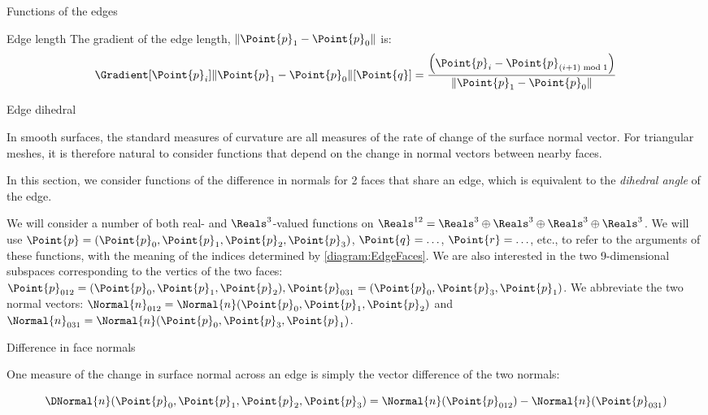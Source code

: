 \begin{plSection}{Functions of the edges}
\begin{plSection}{Edge length}
The gradient of the edge length, $\|\Point{p}_1 - \Point{p}_0\|$ is:
\begin{equation}
\Gradient[\Point{p}_i]{\| \Point{p}_1 - \Point{p}_0 \|}[\Point{q}] =
\frac{\left( \Point{p}_i - \Point{p}_{(i+1) \bmod 1} \right)}
{\|\Point{p}_1 - \Point{p}_0\|}
\end{equation}

\end{plSection}%

\begin{plSection}{Edge dihedral}
\label{sec:edge_dihedral}

In smooth surfaces,
the standard measures of curvature are all measures
of the rate of change of the surface normal vector.
For triangular meshes, it is therefore natural to
consider functions that depend on the change in
normal vectors between nearby faces.

In this section, we consider functions of the difference
in normals for 2 faces that share an edge,
which is equivalent to the {\it dihedral angle} of the edge.

We will consider a number of both real- and $\Reals^3$-valued functions on
$\Reals^{12} = \Reals^3 \oplus \Reals^3 \oplus \Reals^3 \oplus \Reals^3$.
We will use 
$\Point{p} = (\Point{p}_0, \Point{p}_1, \Point{p}_2, \Point{p}_3)$, 
$\Point{q}=\ldots$, $\Point{r}=\ldots$, etc.,
to refer to the arguments of these functions, with the meaning
of the indices determined by \cref{diagram:EdgeFaces}.
We are also interested in the two 9-dimensional subspaces
corresponding to the vertics of the two faces:
$\Point{p}_{012} = 
(\Point{p}_0,\Point{p}_1,\Point{p}_2), \Point{p}_{031} = 
(\Point{p}_0,\Point{p}_3,\Point{p}_1)$.
We abbreviate the two normal vectors:
$\Normal{n}_{012} = \Normal{n}(\Point{p}_0,\Point{p}_1,\Point{p}_2)$
and
$\Normal{n}_{031} = \Normal{n}(\Point{p}_0,\Point{p}_3,\Point{p}_1)$.

\end{plSection}%

\begin{plSection}{Difference in face normals}
\label{sec:normal_difference}

One measure of the change in surface normal across an edge
is simply the vector difference of the two normals:

\begin{equation}
\label{eq:deltan}
\DNormal{n} (\Point{p}_0, \Point{p}_1, \Point{p}_2, \Point{p}_3)
=
\Normal{n} (\Point{p}_{012}) - \Normal{n} (\Point{p}_{031})
\end{equation}


\end{plSection}
\end{plSection}

